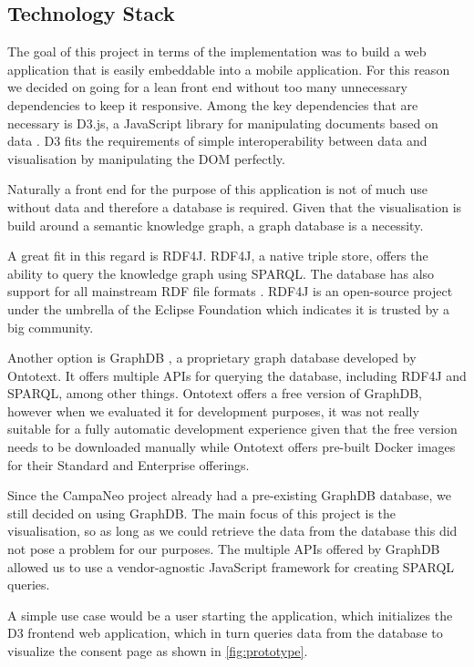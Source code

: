 \documentclass[../paper.tex]{subfiles}
\begin{document}
  \subsection{Technology Stack}

  The goal of this project in terms of the implementation was to
  build a web application that is easily embeddable into a mobile application.
  For this reason we decided on going for a lean front end without too many
  unnecessary dependencies to keep it responsive. Among the key dependencies that
  are necessary is D3.js, a JavaScript library for manipulating documents based
  on data \cite{d3}. D3 fits the requirements of simple interoperability between
  data and visualisation by manipulating the DOM perfectly.

  Naturally a front end for the purpose of this application is not of much use
  without data and therefore a database is required. Given that the
  visualisation is build around a semantic knowledge graph, a graph database is
  a necessity.

  A great fit in this regard is RDF4J. RDF4J, a native triple
  store, offers the ability to query the knowledge graph using SPARQL. The
  database has also support for all mainstream RDF file formats \cite{rdf4j}.
  RDF4J is an open-source project under the umbrella of the Eclipse Foundation
  which indicates it is trusted by a big community.

  Another option is GraphDB \cite{graphdb}, a proprietary graph database developed by Ontotext.
  It offers multiple APIs for querying the database, including RDF4J and SPARQL,
  among other things. Ontotext offers a free version of GraphDB, however when
  we evaluated it for development purposes, it was not really suitable for a
  fully automatic development experience given that the free version needs to
  be downloaded manually while Ontotext offers pre-built Docker images for
  their Standard and Enterprise offerings.

  Since the CampaNeo project already had a pre-existing GraphDB database, we
  still decided on using GraphDB. The main focus of this project is the
  visualisation, so as long as we could retrieve the data from the database
  this did not pose a problem for our purposes. The multiple APIs offered by
  GraphDB allowed us to use a vendor-agnostic JavaScript framework for
  creating SPARQL queries.

  A simple use case would be a user starting the application, which initializes
  the D3 frontend web application, which in turn queries data from the database
  to visualize the consent page as shown in \cref{fig:prototype}.
\end{document}
